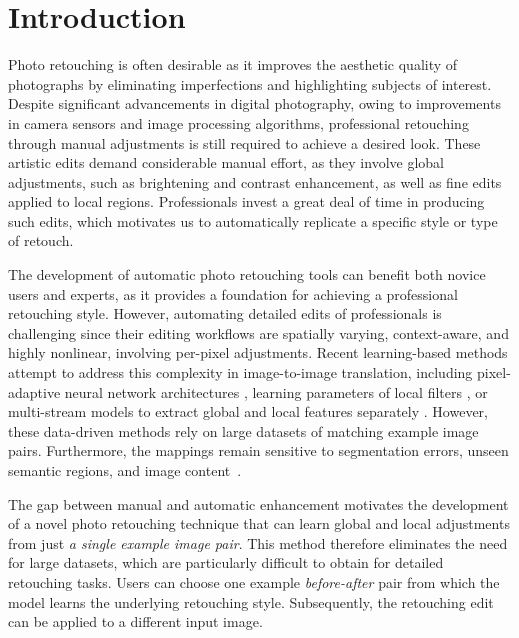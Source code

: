 


\section{Introduction}\label{sec:introduction}

Photo retouching is often desirable as it improves the aesthetic quality of photographs by eliminating imperfections and \nobreak highlighting subjects of interest. Despite significant advancements in digital photography, owing to improvements in camera sensors and image processing algorithms, professional retouching through manual adjustments is still required to achieve a desired look. These artistic edits demand considerable manual effort, as they involve global adjustments, such as brightening and contrast enhancement, as well as fine edits applied to local regions. Professionals invest a great deal of time in producing such edits, which motivates us to automatically replicate a specific style or type of retouch.

The development of automatic photo retouching tools can benefit both novice users and experts, as it provides a foundation for achieving a professional retouching style. However, automating detailed edits of professionals is challenging since their editing workflows are spatially varying, context-aware, and highly nonlinear, involving per-pixel adjustments. Recent learning-based methods attempt to address this complexity in image-to-image translation, including pixel-adaptive neural network architectures \cite{shaham2021spatially, li2020lapar}, learning parameters of local filters \cite{moran2020deeplpf}, or multi-stream models to extract global and local features separately \cite{Gharbi17Deep}. However, these data-driven methods rely on large datasets of matching example image pairs. Furthermore, the mappings remain sensitive to segmentation errors, unseen semantic regions, and image content~\cite{yan2016automatic}.




The gap between manual and automatic enhancement motivates the development of a novel photo retouching technique that can learn global and local adjustments from just \emph{a single example image pair}. This method therefore eliminates the need for large datasets, which are particularly difficult to obtain for detailed retouching tasks. Users can choose one example \emph{before-after} pair from which the model learns the underlying retouching style. Subsequently, the retouching edit can be applied to a different input image.

